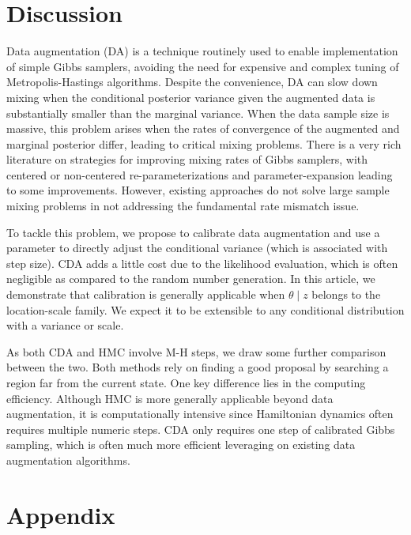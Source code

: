 \documentclass[12pt]{article}
\begin{document}
\section{Discussion}
Data augmentation (DA) is a technique routinely used to enable implementation of simple Gibbs samplers, avoiding the need for expensive and complex tuning of Metropolis-Hastings algorithms.
Despite the convenience, DA can slow down mixing when the conditional posterior variance given the augmented data is substantially smaller than the marginal variance.  When the data sample size is massive, this problem arises when the rates of convergence of the augmented and marginal posterior differ, leading to 
critical mixing problems.  There is a very rich literature on strategies for improving mixing rates of Gibbs samplers, with centered or non-centered re-parameterizations \citep{papaspiliopoulos2007general} and parameter-expansion \citep{liu1999parameter} leading to some improvements.  However, existing approaches {do not} solve large sample mixing problems in not addressing the fundamental rate
mismatch issue.

To tackle this problem, we propose to calibrate data augmentation and use a parameter to directly adjust the conditional variance (which is associated with step size).  CDA adds a little cost due to the likelihood evaluation, which is often negligible as compared to the random number generation. In this article, we demonstrate that calibration is generally applicable when $\theta \mid z$ belongs to the location-scale family. We expect it to be extensible to any conditional distribution with a variance or scale.

As both CDA and HMC involve M-H steps, we draw some further comparison between the two. Both methods rely on finding a good proposal by searching a region far from the current state. One key difference lies in the computing efficiency. Although HMC is more generally applicable beyond data augmentation, it is computationally intensive since Hamiltonian dynamics often requires multiple numeric steps. CDA only requires one step of calibrated Gibbs sampling, which is often much more efficient leveraging on existing data augmentation algorithms.



\appendix
\section{Appendix}
\end{document}
